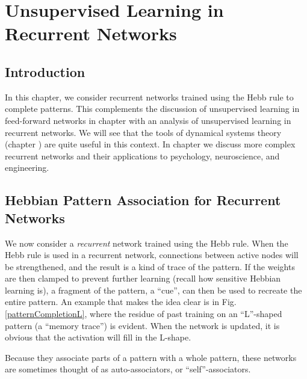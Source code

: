 \chapter{Unsupervised Learning in Recurrent Networks}\label{ch_unsupervised_recurrent}


\section{Introduction}

In this chapter, we consider recurrent networks trained using the Hebb rule to complete patterns. This complements the discussion of unsupervised learning in feed-forward networks in chapter  with an analysis of unsupervised learning in recurrent networks. We will see that the tools of dynamical systems theory (chapter ) are quite useful in this context. In chapter  we discuss more complex recurrent networks and their applications to psychology, neuroscience, and engineering.
  
\section{Hebbian Pattern Association for Recurrent Networks}

We now consider a \emph{recurrent} network trained using the Hebb rule. When the Hebb rule is used in a recurrent network, connections between active nodes will be strengthened, and the result is a kind of trace of the pattern. If the weights are then clamped to prevent further learning (recall how sensitive Hebbian learning is), a fragment of the pattern, a ``cue'', can then be used to recreate the entire pattern. An example that makes the idea clear is in Fig. \ref{patternCompletionL}, where the residue of past training on an ``L''-shaped pattern (a ``memory trace'') is evident. When the network is updated, it is obvious that the activation will fill in the L-shape. 

Because they associate parts of a pattern with a whole pattern, these networks are sometimes thought of as auto-associators, or ``self''-associators.

